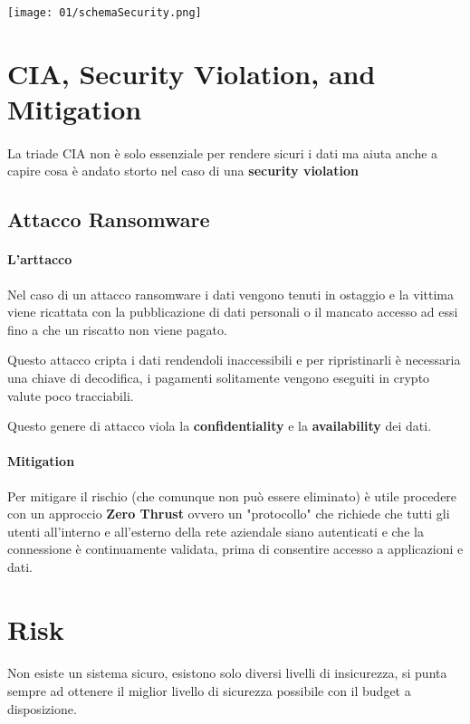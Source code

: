         \texttt{[image: 01/schemaSecurity.png]}
\section{CIA, Security Violation, and Mitigation}
    \paragraph{} La triade CIA non è solo essenziale per rendere sicuri i dati ma aiuta anche a capire cosa è andato storto nel caso di una \textbf{security violation}
    \subsection{Attacco Ransomware}
        \paragraph{L'arttacco}
            Nel caso di un attacco ransomware i dati vengono tenuti in ostaggio e la vittima viene ricattata con la pubblicazione di dati personali o il mancato accesso ad essi fino a che un riscatto non viene pagato.

            Questo attacco cripta i dati rendendoli inaccessibili e per ripristinarli è necessaria una chiave di decodifica, i pagamenti solitamente vengono eseguiti in crypto valute poco tracciabili.

            Questo genere di attacco viola la \textbf{confidentiality} e la \textbf{availability} dei dati.
        \paragraph{Mitigation}
            Per mitigare il rischio (che comunque non può essere eliminato) è utile procedere con un approccio \textbf{Zero Thrust} ovvero un "protocollo" che richiede che tutti gli utenti all'interno e all'esterno della rete aziendale siano autenticati e che la connessione è continuamente validata, prima di consentire accesso a applicazioni e dati.

\section{Risk}
    \paragraph{} Non esiste un sistema sicuro, esistono solo diversi livelli di insicurezza, si punta sempre ad ottenere il miglior livello di sicurezza possibile con il budget a disposizione.
